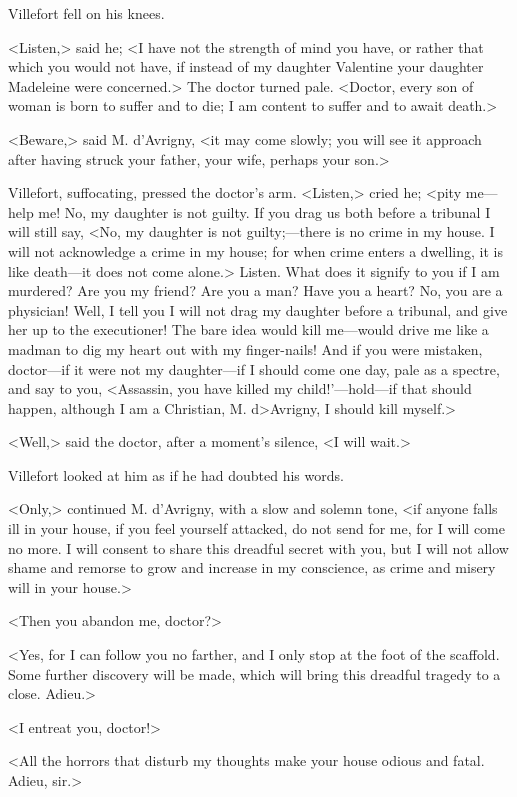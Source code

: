 Villefort fell on his knees. 

 <Listen,> said he; <I have not the strength of mind you have, or rather that which you would not have, if instead of my daughter Valentine your daughter Madeleine were concerned.> The doctor turned pale. <Doctor, every son of woman is born to suffer and to die; I am content to suffer and to await death.> 

 <Beware,> said M. d'Avrigny, <it may come slowly; you will see it approach after having struck your father, your wife, perhaps your son.> 

 Villefort, suffocating, pressed the doctor's arm.  <Listen,> cried he; <pity me—help me! No, my daughter is not guilty. If you drag us both before a tribunal I will still say, <No, my daughter is not guilty;—there is no crime in my house. I will not acknowledge a crime in my house; for when crime enters a dwelling, it is like death—it does not come alone.> Listen. What does it signify to you if I am murdered? Are you my friend? Are you a man? Have you a heart? No, you are a physician! Well, I tell you I will not drag my daughter before a tribunal, and give her up to the executioner! The bare idea would kill me—would drive me like a madman to dig my heart out with my finger-nails! And if you were mistaken, doctor—if it were not my daughter—if I should come one day, pale as a spectre, and say to you, <Assassin, you have killed my child!'—hold—if that should happen, although I am a Christian, M. d>Avrigny, I should kill myself.> 

 <Well,> said the doctor, after a moment's silence, <I will wait.> 

 Villefort looked at him as if he had doubted his words. 

 <Only,> continued M. d'Avrigny, with a slow and solemn tone, <if anyone falls ill in your house, if you feel yourself attacked, do not send for me, for I will come no more. I will consent to share this dreadful secret with you, but I will not allow shame and remorse to grow and increase in my conscience, as crime and misery will in your house.> 

 <Then you abandon me, doctor?> 

 <Yes, for I can follow you no farther, and I only stop at the foot of the scaffold. Some further discovery will be made, which will bring this dreadful tragedy to a close. Adieu.> 

 <I entreat you, doctor!> 

 <All the horrors that disturb my thoughts make your house odious and fatal. Adieu, sir.> 

